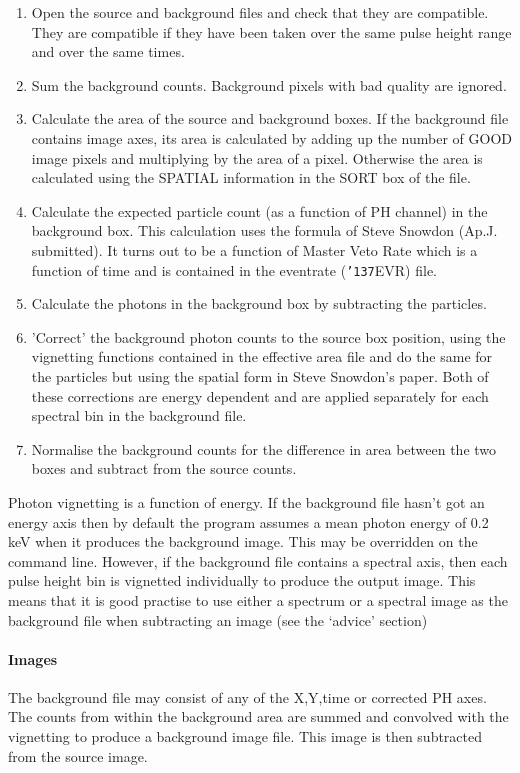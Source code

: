 \documentclass{book}
\renewcommand{\_}{{\tt\char'137}}     %
\begin{document}
\begin{enumerate}
\item Open the source and background files and check that they
are compatible. They are compatible if they have been taken
over the same pulse height range and over the same times.
\item Sum the background counts. Background pixels with bad quality
are ignored.
\item Calculate the area of the source and background boxes. If the
background file contains image axes, its area is calculated
by adding up the number of GOOD image pixels and multiplying
by the area of a pixel. Otherwise the area is calculated
using the SPATIAL information in the SORT box of the file.
\item Calculate the expected particle count (as a function of PH
channel) in the background box. This calculation uses the
formula of Steve Snowdon (Ap.J. submitted). It turns out to
be a function of Master Veto Rate which is a function of
time and is contained in the eventrate (\_EVR) file.
\item Calculate the photons in the background box by subtracting
the particles.
\item 'Correct' the background photon counts to the source box
position, using the vignetting functions contained in the
effective area file and do the same for the particles but
using the spatial form in Steve Snowdon's paper. Both of
these corrections are energy dependent and are applied
separately for each spectral bin in the background file.
 
\item Normalise the background counts for the difference in area
between the two boxes and subtract from the source counts.
\end{enumerate}
Photon vignetting is a function of energy. If the background file
hasn't got an energy axis then by default the program assumes a mean
photon energy of 0.2 keV when it produces the background image.
This may be overridden on the command line. However, if the background
file contains a spectral axis, then each pulse height bin is vignetted
individually to produce the output image. This means that it is
good practise to use either a spectrum or a spectral image as the
background file when subtracting an image (see the `advice' section)
\paragraph{Images}
The background file may consist of any of the X,Y,time or corrected
PH axes. The counts from within the background area are summed and
convolved with the vignetting to produce a background image file.
This image is then subtracted from the source image.
 
\end{document}
